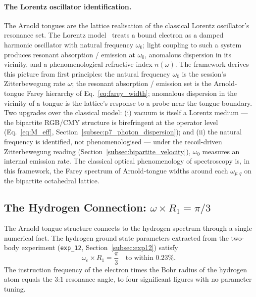 \paragraph{The Lorentz oscillator identification.}
The Arnold tongues are the lattice realisation of the classical
Lorentz oscillator's resonance set.  The Lorentz
model~\cite{lorentz1909} treats a bound electron as a damped
harmonic oscillator with natural frequency $\omega_0$; light coupling to such a system produces
resonant absorption / emission at $\omega_0$, anomalous dispersion
in its vicinity, and a phenomenological refractive index $n(\omega)$.
The framework derives this picture from first principles: the
natural frequency $\omega_0$ is the session's Zitterbewegung rate
$\omega$; the resonant absorption / emission set is the Arnold-tongue
Farey hierarchy of Eq.~\eqref{eq:farey_width}; anomalous dispersion
in the vicinity of a tongue is the lattice's response to a probe
near the tongue boundary.  Two upgrades over the classical model:
(i) vacuum is itself a Lorentz medium --- the bipartite RGB/CMY
structure is birefringent at the operator level
(Eq.~\ref{eq:M_eff}, Section~\ref{subsec:p7_photon_dispersion});
and (ii) the natural frequency is identified, not phenomenologised
--- under the recoil-driven Zitterbewegung reading
(Section~\ref{subsec:bipartite_velocity}), $\omega_0$ measures an
internal emission rate.  The classical optical phenomenology of
spectroscopy is, in this framework, the Farey spectrum of
Arnold-tongue widths around each $\omega_{p:q}$ on the bipartite
octahedral lattice.

\subsection{The Hydrogen Connection: \texorpdfstring{$\omega \times R_1 = \pi/3$}{omega x R\_1 = pi/3}}
\label{subsec:hydrogen_resonance}

The Arnold tongue structure connects to the hydrogen spectrum
through a single numerical fact. The hydrogen ground state
parameters extracted from the two-body experiment
(\texttt{exp\_12}, Section~\ref{subsec:exp12}) satisfy
\begin{equation}
    \omega_e \times R_1 = \frac{\pi}{3}
        \quad \text{to within } 0.23\%.
    \label{eq:hydrogen_pi3}
\end{equation}
The instruction frequency of the electron times the Bohr radius of
the hydrogen atom equals the 3:1 resonance angle, to four
significant figures with no parameter tuning.

